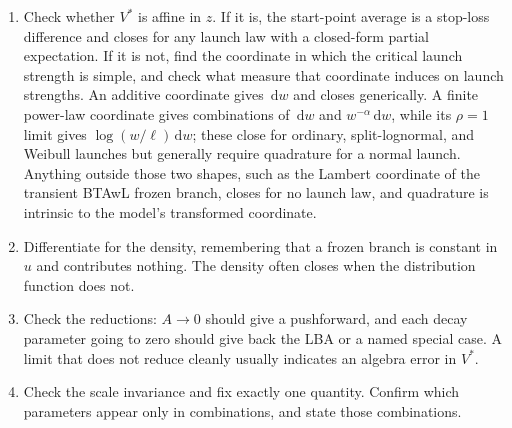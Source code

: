 \documentclass[12pt]{article}
\newcommand{\dd}{\,\mathrm{d}}
\theoremstyle{remark}
\begin{document}
\begin{enumerate}
        one-line calculation and it tells you what kind of model you have.
  \item Check whether $V^{*}$ is affine in $z$. If it is, the start-point average is a stop-loss difference and closes for any launch law with a closed-form partial expectation. If it is not, find the coordinate in which the critical launch strength is simple, and check what measure that coordinate induces on launch strengths. An additive coordinate gives $\dd w$ and closes generically. A finite power-law coordinate gives combinations of $\dd w$ and $w^{-\alpha}\dd w$, while its $\rho=1$ limit gives $\log(w/\ell)\dd w$; these close for ordinary, split-lognormal, and Weibull launches but generally require quadrature for a normal launch. Anything outside those two shapes, such as the Lambert coordinate of the transient BTAwL frozen branch, closes for no launch law, and quadrature is intrinsic to the model's transformed coordinate.
  \item Differentiate for the density, remembering that a frozen branch is constant in $u$ and contributes nothing. The density often closes when the distribution function does not.
  \item Check the reductions: $A \to 0$ should give a pushforward, and each decay parameter going to zero should give back the LBA or a named special case. A limit that does not reduce cleanly usually indicates an algebra error in $V^{*}$.
  \item Check the scale invariance and fix exactly one quantity. Confirm which parameters appear only in combinations, and state those combinations.
\end{enumerate}

\end{document}
